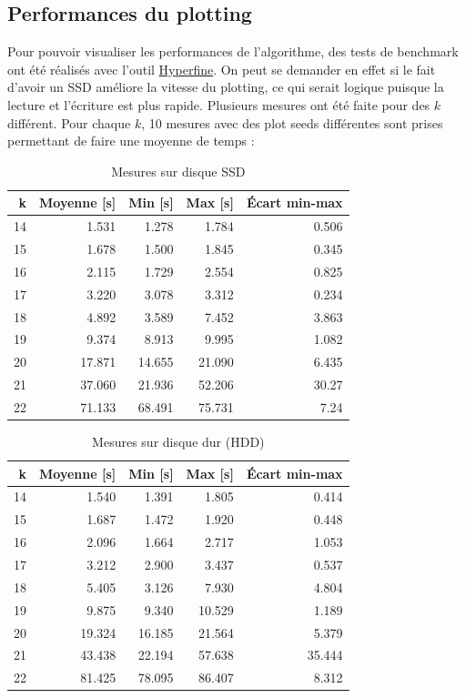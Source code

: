 \newpage
\subsection{Performances du plotting}

Pour pouvoir visualiser les performances de l'algorithme, des tests de benchmark ont été réalisés avec l'outil \href{https://github.com/sharkdp/hyperfine}{Hyperfine}. On peut se demander en effet si le fait d'avoir un SSD améliore la vitesse du plotting, ce qui serait logique puisque la lecture et l'écriture est plus rapide. Plusieurs mesures ont été faite pour des $k$ différent. Pour chaque $k$, 10 mesures avec des plot seeds différentes sont prises permettant de faire une moyenne de temps :

\begin{table}[H]
  \centering
  \begin{tabular}{rrrrr}
    \textbf{k} & \textbf{Moyenne [s]} & \textbf{Min [s]} & \textbf{Max [s]} & \textbf{Écart min-max} \\
    \hline
    \hline
    14 & 1.531 & 1.278 & 1.784 & 0.506 \\
    \hline
    15 & 1.678 & 1.500   & 1.845 & 0.345 \\
    \hline
    16 & 2.115  & 1.729  & 2.554  & 0.825 \\
    \hline
    17 & 3.220   & 3.078  & 3.312  & 0.234 \\
    \hline
    18 & 4.892  & 3.589  & 7.452  & 3.863 \\
    \hline
    19 & 9.374  & 8.913  & 9.995  & 1.082 \\
    \hline
    20 & 17.871 & 14.655 & 21.090  & 6.435 \\
    \hline
    21 & 37.060  & 21.936 & 52.206 & 30.27 \\
    \hline
    22 & 71.133 & 68.491 & 75.731 & 7.24
  \end{tabular}
  \caption{Mesures sur disque SSD}
\end{table}

\begin{table}[H]
  \centering
  \begin{tabular}{rrrrr}
    \textbf{k} & \textbf{Moyenne [s]} & \textbf{Min [s]} & \textbf{Max [s]} & \textbf{Écart min-max} \\
    \hline
    \hline
    14 & 1.540  & 1.391  & 1.805  & 0.414  \\
    \hline
    15 & 1.687  & 1.472  & 1.920  & 0.448  \\
    \hline
    16 & 2.096  & 1.664  & 2.717  & 1.053  \\
    \hline
    17 & 3.212  & 2.900  & 3.437  & 0.537  \\
    \hline
    18 & 5.405  & 3.126  & 7.930  & 4.804  \\
    \hline
    19 & 9.875  & 9.340  & 10.529 & 1.189  \\
    \hline
    20 & 19.324 & 16.185 & 21.564 & 5.379  \\
    \hline
    21 & 43.438 & 22.194 & 57.638 & 35.444 \\
    \hline
    22 & 81.425 & 78.095 & 86.407 & 8.312
  \end{tabular}
  \caption{Mesures sur disque dur (HDD)}
\end{table}

